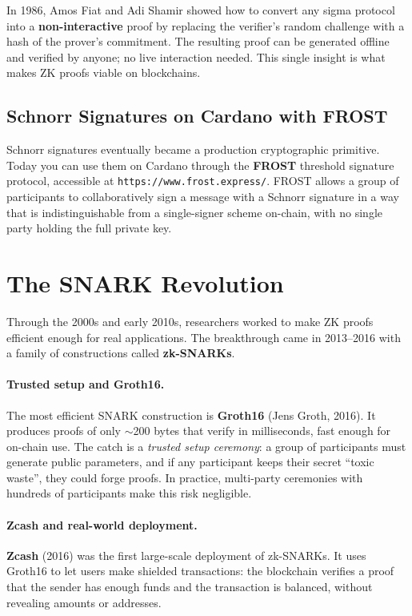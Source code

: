In 1986, Amos Fiat and Adi Shamir showed how to convert any sigma protocol into a \textbf{non-interactive} proof by replacing the verifier's random challenge with a hash of the prover's commitment. The resulting proof can be generated offline and verified by anyone; no live interaction needed. This single insight is what makes ZK proofs viable on blockchains.

\subsection*{Schnorr Signatures on Cardano with FROST}

Schnorr signatures eventually became a production cryptographic primitive. Today you can use them on Cardano through the \textbf{FROST} threshold signature protocol, accessible at \texttt{https://www.frost.express/}. FROST allows a group of participants to collaboratively sign a message with a Schnorr signature in a way that is indistinguishable from a single-signer scheme on-chain, with no single party holding the full private key.

\section{The SNARK Revolution}

Through the 2000s and early 2010s, researchers worked to make ZK proofs efficient enough for real applications. The breakthrough came in 2013--2016 with a family of constructions called \textbf{zk-SNARKs}.

\paragraph{Trusted setup and Groth16.}
The most efficient SNARK construction is \textbf{Groth16} (Jens Groth, 2016). It produces proofs of only $\sim$200 bytes that verify in milliseconds, fast enough for on-chain use. The catch is a \emph{trusted setup ceremony}: a group of participants must generate public parameters, and if any participant keeps their secret ``toxic waste'', they could forge proofs. In practice, multi-party ceremonies with hundreds of participants make this risk negligible.

\paragraph{Zcash and real-world deployment.}
\textbf{Zcash} (2016) was the first large-scale deployment of zk-SNARKs. It uses Groth16 to let users make shielded transactions: the blockchain verifies a proof that the sender has enough funds and the transaction is balanced, without revealing amounts or addresses.

